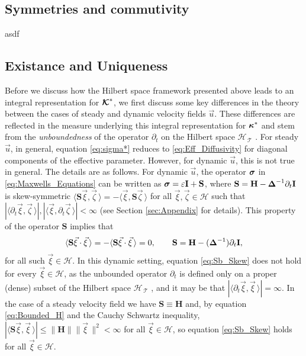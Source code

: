 \documentclass[11pt]{amsart}
\newcommand{\Hb}{\mathbf{H}}
\newcommand{\Ib}{\mathbf{I}}
\newcommand{\Sb}{\mathbf{S}}
\newcommand\Kbc{\mbox{\boldmath${\mathcal{K}}$}}
\newcommand{\Tc}{\mathcal{T}}
\newcommand{\Hs}{\mathscr{H}}
\newcommand\bsig{\mbox{\boldmath${\sigma}$}}
\newcommand\bDelta{\mbox{\boldmath${\Delta}$}}
\newcommand\bkappa{\mbox{\boldmath${\kappa}$}}
\begin{document}
\subsection{Symmetries and commutivity}\label{sec:Symmetries_Commute}
%
asdf

\subsection{Existance and Uniqueness}\label{sec:Existance!}
%
Before we discuss how the Hilbert space framework presented above
leads to an  integral representation for $\Kbc^*$, we first discuss
some key differences in the theory between the cases of steady 
and dynamic velocity fields $\vec{u}$. These differences are reflected
in the measure underlying this integral representation for $\bkappa^*$
and stem from the \emph{unboundedness} of the operator $\partial_t$ on the
Hilbert space $\Hs_{\,\Tc}$ \cite{Reed-1980,Stone:64}. For steady
$\vec{u}$, in general, equation \eqref{eq:sigma*} reduces to
\eqref{eq:Eff_Diffusivity} for  diagonal components of the effective
parameter.  However, for dynamic $\vec{u}$, this is not true in
general. The details are as follows. For dynamic $\vec{u}$, the
operator $\bsig$ in \eqref{eq:Maxwells_Equations} can be written as
$\bsig=\varepsilon\Ib+\Sb$, where  $\Sb=\Hb-\bDelta^{-1}\partial_t\Ib$ is skew-symmetric 
$\langle\Sb\vec{\xi},\vec{\zeta}\,\rangle=-\langle\vec{\xi},\Sb\vec{\zeta}\,\rangle$ for all
$\vec{\xi},\vec{\zeta}\in\Hs$ such that
$|\langle\partial_t\vec{\xi},\vec{\zeta}\,\rangle|,|\langle\vec{\xi},\partial_t\vec{\zeta}\,\rangle|<\infty$ (see Section
\ref{sec:Appendix} for details).  
This property of the operator $\Sb$ implies that
%
\begin{align}\label{eq:Sb_Skew_2}
  \langle\Sb\vec{\xi}\cdot\vec{\xi}\,\rangle=-\langle\Sb\vec{\xi}\cdot\vec{\xi}\,\rangle=0,
  \qquad
  \Sb=\Hb-(\bDelta^{-1})\partial_t\Ib,
\end{align}
%
for all such $\vec{\xi}\in\Hs$. In this dynamic setting, equation
\eqref{eq:Sb_Skew} does not hold for every $\vec{\xi}\in\Hs$, as the
unbounded operator $\partial_t$ is defined only on a proper (dense) subset of
the Hilbert space $\Hs_{\,\Tc}$ \cite{Reed-1980}, and it may be that
$|\langle\partial_t\vec{\xi},\vec{\xi}\,\rangle|=\infty$. In the case of a steady velocity field
we have $\Sb\equiv\Hb$ and, by equation \eqref{eq:Bounded_H} and the Cauchy
Schwartz inequality, $|\langle\Sb\vec{\xi},\vec{\xi}\,\rangle|\leq\|\Hb\|\|\vec{\xi}\,\|^2<\infty$ for
all $\vec{\xi}\in\Hs$, so equation \eqref{eq:Sb_Skew} holds for all
$\vec{\xi}\in\Hs$.   
\end{document}
